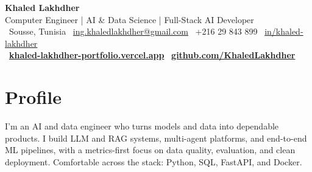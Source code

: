 \documentclass[11pt,a4paper]{article}
\begin{document}
\raggedright   %

\begin{center}
  {\LARGE\bfseries\color{accent} Khaled Lakhdher}\\[3pt]
  {\large\color{muted} Computer Engineer \;|\; AI \& Data Science \;|\; Full-Stack AI Developer}\\[5pt]
  {\small\color{muted}
    {\color{accent}\faMapMarker}~Sousse, Tunisia \quad\textbar\quad
    {\color{accent}\faEnvelope}~\href{mailto:ing.khaledlakhdher@gmail.com}{ing.khaledlakhdher@gmail.com} \quad\textbar\quad
    {\color{accent}\faPhone}~+216 29 843 899 \quad\textbar\quad
    {\color{accent}\faLinkedin}~\href{https://www.linkedin.com/in/khaled-lakhdher}{in/khaled-lakhdher}
  }\\[3pt]
  {\small {\color{accent}\faGlobe}~\href{https://khaled-lakhdher-portfolio.vercel.app}{\textbf{\color{accent}khaled-lakhdher-portfolio.vercel.app}} \quad\textbar\quad {\color{accent}\faGithub}~\href{https://github.com/KhaledLakhdher}{\textbf{\color{accent}github.com/KhaledLakhdher}}}
\end{center}

\section{Profile}
I'm an AI and data engineer who turns models and data into dependable products. I build LLM and RAG
systems, multi-agent platforms, and end-to-end ML pipelines, with a metrics-first focus on data quality,
evaluation, and clean deployment. Comfortable across the stack: Python, SQL, FastAPI, and Docker.

\end{document}

